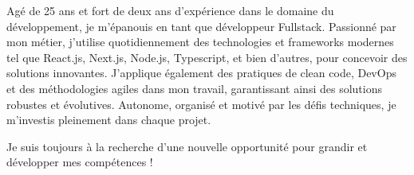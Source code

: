
\begin{cvparagraph}
    Agé de 25 ans et fort de deux ans d'expérience dans le domaine du développement, je m'épanouis en tant que développeur Fullstack. Passionné par mon métier, j'utilise quotidiennement des technologies et frameworks modernes tel que React.js, Next.js, Node.js, Typescript, et bien d'autres, pour concevoir des solutions innovantes. J'applique également des pratiques de clean code, DevOps et des méthodologies agiles dans mon travail, garantissant ainsi des solutions robustes et évolutives. Autonome, organisé et motivé par les défis techniques, je m'investis pleinement dans chaque projet.
    
    Je suis toujours à la recherche d'une nouvelle opportunité pour grandir et développer mes compétences !
\end{cvparagraph}
